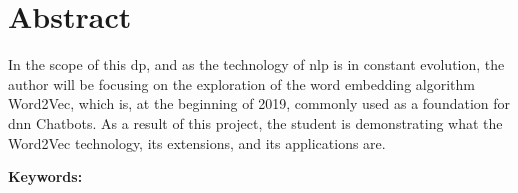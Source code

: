 \chapter*{Abstract}

In the scope of this \gls{dp}, and as the technology of \acrshort{nlp} is in constant evolution, the author will be focusing on the exploration of the word embedding algorithm Word2Vec, which is, at the beginning of 2019, commonly used as a foundation for \acrshort{dnn} Chatbots. As a result of this project, the student is demonstrating what the Word2Vec technology, its extensions, and its applications are.

\vskip0.5cm
\textbf{Keywords:} 
\Keywords